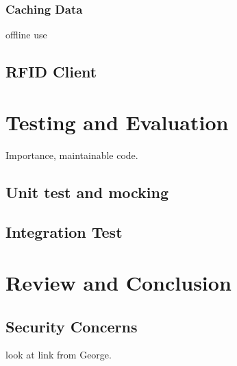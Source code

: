 \documentclass[a4paper, 11pt]{article}
\begin{document}
\subsubsection{Caching Data} offline use 

\subsection{RFID Client}%

\section{Testing and Evaluation}
Importance, maintainable code.
\subsection{Unit test and mocking}
\subsection{Integration Test}

\section{Review and Conclusion}
\subsection{Security Concerns} look at link from George. 



\vspace{\baselineskip}
\vspace{\baselineskip}
\vspace{\baselineskip}
\end{document}
